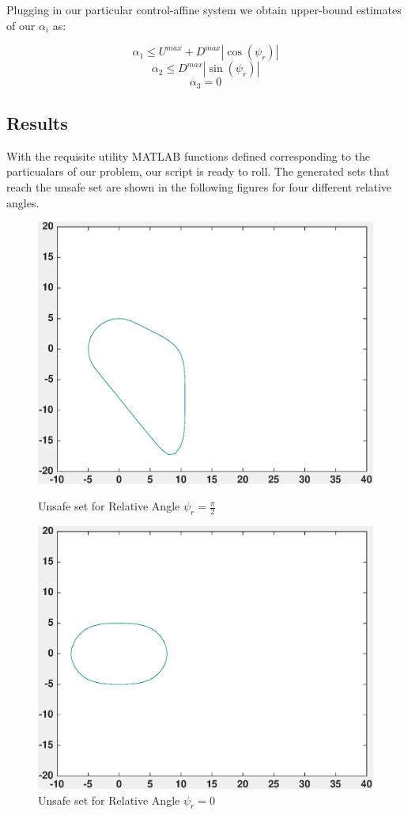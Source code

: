 \documentclass[a4paper]{article}
\begin{document}
Plugging in our particular control-affine system we obtain upper-bound estimates of our $\alpha_i$ as:

$$
\alpha_1 \leq U^{max} + D^{max} |\cos(\psi_r)|
$$
$$
\alpha_2 \leq D^{max} |\sin(\psi_r)|
$$
$$
\alpha_3 = 0
$$

\subsection{Results}
With the requisite utility MATLAB functions defined corresponding to the particualars of our problem, our script is ready to roll.
The generated sets that reach the unsafe set are shown in the following figures for four different relative angles.

\begin{figure}[!ht]
  \centering
  \begin{minipage}[b]{0.4\textwidth}
    \includegraphics[width=1.0\textwidth]{velCont_psi13.eps}
    \caption{Unsafe set for Relative Angle $\psi_r = \frac{\pi}{2}$}
  \end{minipage}
  \hfill
  \begin{minipage}[b]{0.4\textwidth}
    \includegraphics[width=1.0\textwidth]{velCont_psi1.eps}
    \caption{Unsafe set for Relative Angle $\psi_r = 0$}
  \end{minipage}
\end{figure}
\end{document}

